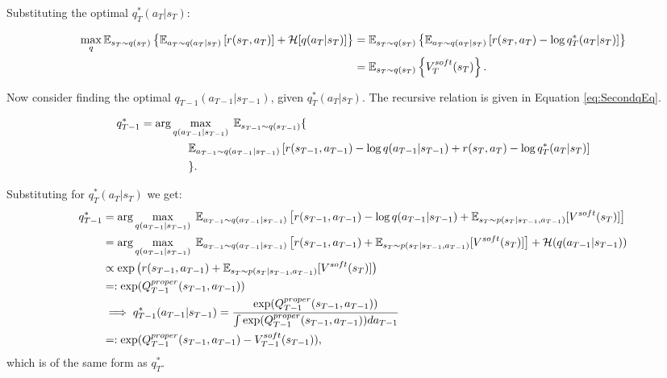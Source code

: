 \documentclass{report}
\numberwithin{equation}{section}
\numberwithin{figure}{section}
\numberwithin{table}{section}
\numberwithin{algorithm}{section}
\begin{document}
Substituting the optimal $q^*_T(a_T|s_T)$:

\begin{align*}
  \max_{q} \mathbb{E}_{s_T\sim q(s_T)}\left\{\mathbb{E}_{a_T\sim q(a_T|s_T)}\left[
    r(s_T, a_T)
  \right] + \mathcal{H}[q(a_T|s_T)]
  \right\}&=\mathbb{E}_{s_T\sim q(s_T)}\left\{
    \mathbb{E}_{a_T\sim q(a_T|s_T)}\left[
    r(s_T, a_T)
   -\log q^*_T(a_T|s_T)\right]\right\}\notag\\
   &=\mathbb{E}_{s_T\sim q(s_T)}\left\{
    V^{soft}_T(s_T)\right\}.
\end{align*}

Now consider finding the optimal $q_{T-1}(a_{T-1}|s_{T-1})$, 
given $q_T^*(a_T|s_T)$. The recursive relation is given 
in Equation \ref{eq:SecondqEq}.

\begin{align}\label{eq:SecondqEq}
  q_{T-1}^*&=\arg \max_{q(a_{T-1}|s_{T-1})}\; \mathbb{E}_{s_{T-1}\sim q(s_{T-1})}\{\notag\\
    &\qquad\qquad \;\mathbb{E}_{a_{T-1}\sim q(a_{T-1}|s_{T-1})}
    \left[
      r(s_{T-1},a_{T-1}) - \log q(a_{T-1}|s_{T-1})
      + r(s_{T}, a_T) - \log q^*_{T}(a_T|s_T)
    \right]\notag\\
  &\qquad\qquad\;\}.
\end{align}

Substituting for $q^*_T(a_T|s_T)$ we get:
\begin{align*}
  q^*_{T-1}&=\arg \max_{q(a_{T-1}|s_{T-1})}\;
  \mathbb{E}_{a_{T-1}\sim q(a_{T-1}|s_{T-1})}
  \left[
    r(s_{T-1},a_{T-1}) - \log q(a_{T-1}|s_{T-1})
    + \mathbb{E}_{s_T\sim p(s_{T}|s_{T-1},a_{T-1})}[V^{soft}(s_T)]
  \right]\notag\\
  &=\arg \max_{q(a_{T-1}|s_{T-1})}\;
  \mathbb{E}_{a_{T-1}\sim q(a_{T-1}|s_{T-1})}
  \left[
    r(s_{T-1},a_{T-1}) + \mathbb{E}_{s_T\sim p(s_{T}|s_{T-1},a_{T-1})}[V^{soft}(s_T)]
  \right] + \mathcal{H}(q(a_{T-1}|s_{T-1}))\notag\\
  &\propto \exp\left(r(s_{T-1},a_{T-1}) + \mathbb{E}_{s_T\sim p(s_{T}|s_{T-1},a_{T-1})}[V^{soft}(s_T)]\right)\notag\\
  &=:\exp(Q^{proper}_{T-1}(s_{T-1}, a_{T-1}))\notag\\
  &\implies q^*_{T-1}(a_{T-1}|s_{T-1})=\frac{\exp(Q^{proper}_{T-1}(s_{T-1}, a_{T-1}))}{\int \exp(Q^{proper}_{T-1}(s_{T-1}, a_{T-1}))da_{T-1}}\notag\\
  &=:\exp(Q^{proper}_{T-1}(s_{T-1},a_{T-1})-V^{soft}_{T-1}(s_{T-1})),
\end{align*}
which is of the same form as $q^*_T$.
\end{document}

